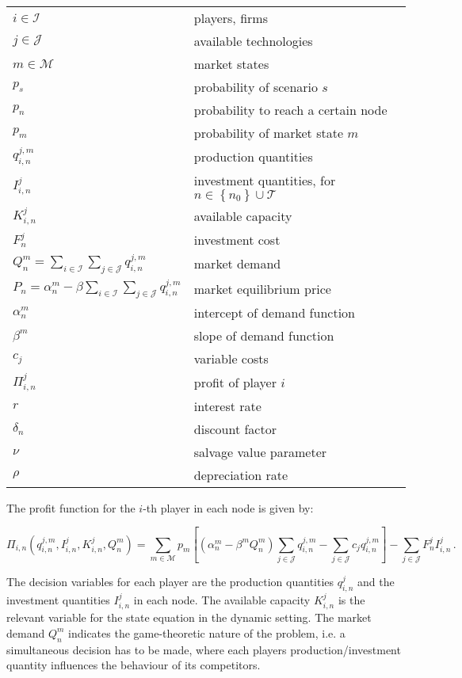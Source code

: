 \vspace{1cm}
\begin{tabular}[l]{l l}
\centering
$i \in \mathcal{I}$ & players, firms \\
$j \in \mathcal{J}$ & available technologies \\
$m\in\mathcal{M}$ & market states \\
$p_s$ & probability of scenario $s$\\
$p_n$ & probability to reach a certain node\\
$p_m$ & probability of market state $m$ \\
$ q_{i,n}^{j,m}$ & production quantities \\
$I_{i,n}^{j}$ & investment quantities, for $n\in\left\{n_0\right\}\cup\mathcal{T}$ \\
$K_{i,n}^{j}$ & available capacity\\
$F_n^{j}$ & investment cost\\
$Q_n^m = \sum_{i\in \mathcal{I}}\sum_{j\in \mathcal{J}} q_{i,n}^{j,m}$ & market demand \\
$P_n = \alpha_n^m-\beta\sum_{i\in \mathcal{I}}\sum_{j\in \mathcal{J}}q_{i,n}^{j,m}$ & market equilibrium price \\
$\alpha_n^m$ & intercept of demand function \\
$\beta^m$ & slope of demand function \\
$c_j$ & variable costs \\
$\Pi_{i,n}^j$ & profit of player $i$\\
$r$ & interest rate \\
$\delta_n$ & discount factor \\
$\nu$ & salvage value parameter\\
$\rho$ & depreciation rate\\
\end{tabular}
\vspace{1cm}

The profit function for the $i$-th player in each node is given by:

\begin{equation}
\Pi_{i,n}\left(q_{i,n}^{j,m},I_{i,n}^j,K_{i,n}^j,Q_n^m\right) = \sum_{m\in\mathcal{M}}p_m\left[\left(\alpha_n^m-\beta^m Q_n^m \right)\sum_{j\in \mathcal{J}}q_{i,n}^{j,m}-\sum_{j\in \mathcal{J}}c_jq_{i,n}^{j,m}\right]-\sum_{j\in \mathcal{J}}F_n^{j}I_{i,n}^{j}\,.
\end{equation}

The decision variables for each player are the production quantities $q_{i,n}^j$ and the investment quantities $I_{i,n}^j$ in each node. The available capacity $K_{i,n}^j$ is the relevant variable for the state equation in the dynamic setting. The market demand $Q_n^m$ indicates the game-theoretic nature of the problem, i.e. a simultaneous decision has to be made, where each players production/investment quantity influences the behaviour of its competitors.

